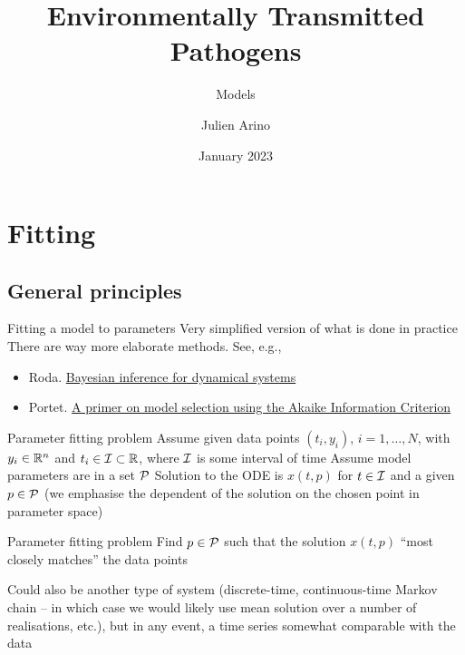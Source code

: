 \documentclass[aspectratio=43]{beamer}
\title{Environmentally Transmitted Pathogens}
\subtitle{Models}
\author{Julien Arino}
\date{January 2023}
\begin{document}

\begin{frame}
  \titlepage
\end{frame}
\addtocounter{page}{-1}



\section{Fitting}

\subsection{General principles}
\begin{frame}{Fitting a model to parameters}
Very simplified version of what is done in practice
\vfill
There are way more elaborate methods. See, e.g., 
\begin{itemize}
    \item Roda. \href{https://doi.org/10.1016/j.idm.2019.12.007}{Bayesian inference for dynamical systems}
    \item Portet. \href{https://doi.org/10.1016/j.idm.2019.12.010}{A primer on model selection using the Akaike Information Criterion}
\end{itemize}
\end{frame}

\begin{frame}{Parameter fitting problem}
Assume given data points $(t_i,y_i)$, $i=1,\ldots,N$, with $y_i\in\IR^n$ and $t_i\in\I\subset\IR$, where $\I$ is some interval of time
\vfill
Assume model parameters are  in a set $\P$
\vfill
Solution to the ODE is $x(t,p)$ for $t\in\I$ and a given $p\in\P$ (we emphasise the dependent of the solution on the chosen point in parameter space)
\vfill
{
    \begin{block}{Parameter fitting problem}
        Find $p\in\P$ such that the solution $x(t,p)$ ``most closely matches'' the data points
    \end{block}    
}
\end{frame}

\begin{frame}
    Could also be another type of system (discrete-time, continuous-time Markov chain -- in which case we would likely use mean solution over a number of realisations, etc.), but in any event, a time series somewhat comparable with the data 
\end{frame}
\end{document}
